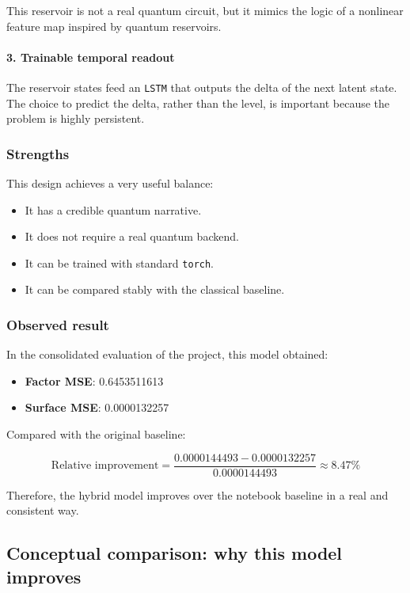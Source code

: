 \documentclass[11pt,a4paper]{article}
\begin{document}
This reservoir is not a real quantum circuit, but it mimics the logic of a nonlinear feature map inspired by quantum reservoirs.

\paragraph{3. Trainable temporal readout}
The reservoir states feed an \texttt{LSTM} that outputs the delta of the next latent state. The choice to predict the delta, rather than the level, is important because the problem is highly persistent.

\subsubsection{Strengths}
This design achieves a very useful balance:

\begin{itemize}
    \item It has a credible quantum narrative.
    \item It does not require a real quantum backend.
    \item It can be trained with standard \texttt{torch}.
    \item It can be compared stably with the classical baseline.
\end{itemize}

\subsubsection{Observed result}
In the consolidated evaluation of the project, this model obtained:

\begin{itemize}
    \item \textbf{Factor MSE}: 0.6453511613
    \item \textbf{Surface MSE}: 0.0000132257
\end{itemize}

Compared with the original baseline:

\[
\text{Relative improvement} =
\frac{0.0000144493 - 0.0000132257}{0.0000144493}
\approx 8.47\%
\]

Therefore, the hybrid model improves over the notebook baseline in a real and consistent way.

\subsection{Conceptual comparison: why this model improves}
\end{document}
